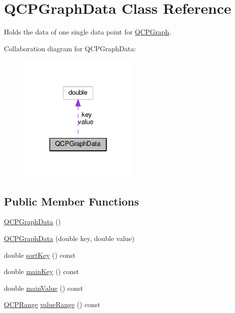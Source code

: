 \hypertarget{classQCPGraphData}{}\section{Q\+C\+P\+Graph\+Data Class Reference}
\label{classQCPGraphData}


Holds the data of one single data point for \hyperlink{classQCPGraph}{Q\+C\+P\+Graph}.  




Collaboration diagram for Q\+C\+P\+Graph\+Data\+:
\nopagebreak
\begin{figure}[H]
\begin{center}
\leavevmode
\includegraphics[width=166pt]{classQCPGraphData__coll__graph}
\end{center}
\end{figure}
\subsection*{Public Member Functions}
\begin{DoxyCompactItemize}
\item 
\hyperlink{classQCPGraphData_ac43f7499383d2fa2ffb7a4ad43f76c7c}{Q\+C\+P\+Graph\+Data} ()
\item 
\hyperlink{classQCPGraphData_a2c32177f12f902f4e05f712837082bd6}{Q\+C\+P\+Graph\+Data} (double key, double value)
\item 
double \hyperlink{classQCPGraphData_aae097cdf07f2c31edbbc7931e1e2e47f}{sort\+Key} () const 
\item 
double \hyperlink{classQCPGraphData_a4466437f7f8ddc63f9239fba54f5629a}{main\+Key} () const 
\item 
double \hyperlink{classQCPGraphData_ad43edfdb885b27e78ec786cc191d4b19}{main\+Value} () const 
\item 
\hyperlink{classQCPRange}{Q\+C\+P\+Range} \hyperlink{classQCPGraphData_a5eb7d51a8cdccbc38b4f745ca0bdfed9}{value\+Range} () const 
\end{DoxyCompactItemize}
